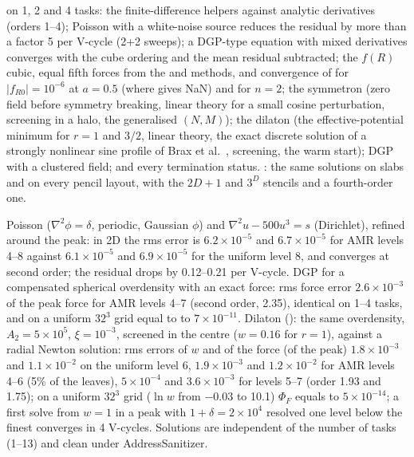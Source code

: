 \begin{validation}
 on 1, 2 and 4 tasks: the finite-difference helpers against analytic derivatives (orders 1--4);
Poisson with a white-noise source reduces the residual by more than a factor 5 per V-cycle (2+2 sweeps); a DGP-type equation
with mixed derivatives converges with the cube ordering and the mean residual subtracted; the $f(R)$ cubic, equal fifth forces
from the  and  methods, and convergence of  for $|f_{R0}|=10^{-6}$ at $a=0.5$ (where 
gives NaN) and for $n=2$; the symmetron (zero field before symmetry breaking, linear theory for a small cosine perturbation,
screening in a halo, the generalised $(N,M)$); the dilaton (the effective-potential minimum for $r=1$ and $3/2$, linear theory,
the exact discrete solution of a strongly nonlinear sine profile of Brax et al.\ \cite{Brax2012}, screening, the warm start); DGP
with a clustered field; and every termination status. : the same solutions on slabs and on
every pencil layout, with the $2D+1$ and $3^D$ stencils and a fourth-order one.
\end{validation}

\begin{validation}
Poisson ($\nabla^2\phi=\delta$, periodic, Gaussian $\phi$) and $\nabla^2u-500u^3=s$ (Dirichlet), refined around the peak: in 2D
the rms error is $6.2\times10^{-5}$ and $6.7\times10^{-5}$ for AMR levels 4--8 against $6.1\times10^{-5}$ and
$6.9\times10^{-5}$ for the uniform level 8, and converges at second order; the residual drops by 0.12--0.21 per V-cycle. DGP for a
compensated spherical overdensity with an exact force: rms force error $2.6\times10^{-3}$ of the peak force for AMR levels 4--7
(second order, 2.35), identical on 1--4 tasks, and on a uniform $32^3$ grid equal to  to
$7\times10^{-11}$. Dilaton (): the same overdensity, $A_2=5\times10^5$, $\xi=10^{-3}$, screened in
the centre ($w=0.16$ for $r=1$), against a radial Newton solution: rms errors of $w$ and of the force (of the peak) $1.8\times10^{-3}$
and $1.1\times10^{-2}$ on the uniform level 6, $1.9\times10^{-3}$ and $1.2\times10^{-2}$ for AMR levels 4--6 (5\% of the leaves), $5\times10^{-4}$
and $3.6\times10^{-3}$ for levels 5--7 (order 1.93 and 1.75); on a uniform $32^3$ grid ($\ln w$ from $-0.03$ to 10.1) $\Phi_F$ equals
 to $5\times10^{-14}$; a first solve from $w=1$ in a peak with $1+\delta=2\times10^4$ resolved one level
below the finest converges in 4 V-cycles. Solutions are independent of the number of tasks (1--13) and clean under AddressSanitizer.
\end{validation}

